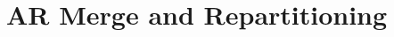 \section{AR Merge and Repartitioning}
\newcommand{\effect}[1]{\Delta #1}
\newcommand{\mergeLS}[3]{\func{merge_L}{#1, #2, #3}}
\newcommand{\orth}[1]{\ensuremath{{#1}^{\bot}}}
\newcommand{\conflict}[3]{\pred{conflict}{#1, #2, #3}}
\newcommand{\FPWorlds}{\sort{FPWorld}}
\newcommand{\fpw}{\ensuremath{\mathbf{w}}}
\newcommand{\fpgs}{\ensuremath{\mathbf{s}}}
\newcommand{\relyU}{\ensuremath{\mathit{R^{u}}}}
\newcommand{\relyE}{\ensuremath{\mathit{R^{e}}}}
\newcommand{\guarU}{\ensuremath{\mathit{G^{u}}}}
\newcommand{\guarE}{\ensuremath{\mathit{G^{e}}}}
\newcommand{\myrely}{\ensuremath{\mathcal R}}
\newcommand{\myguar}{\ensuremath{\mathcal G}}
\newcommand{\mergeW}[2]{\func{merge}{#1, #2}}
\newcommand{\mergeWAux}[3]{\func{merge_W}{#1, #2, #3}}

\newcommand{\erase}[1]{\ensuremath{\llfloor #1 \rrfloor}}
\newcommand{\lift}[1]{\ensuremath{\llceil #1 \rrceil}}

